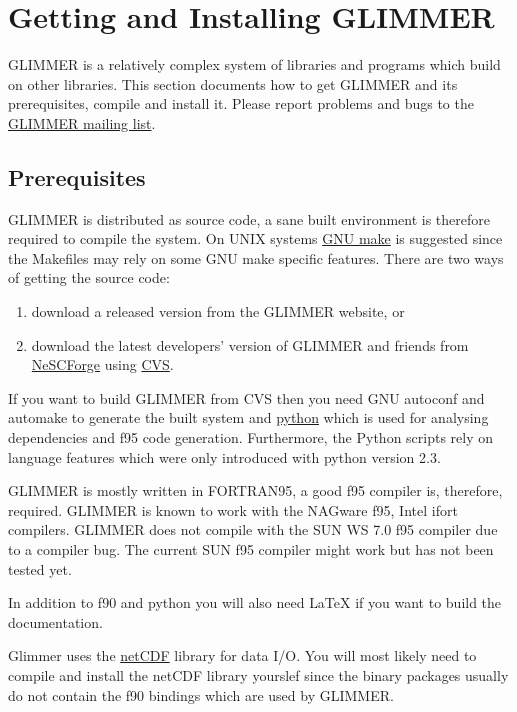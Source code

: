 \section{Getting and Installing GLIMMER}
GLIMMER is a relatively complex system of libraries and programs which build on other libraries. This section documents how to get GLIMMER and its prerequisites, compile and install it. Please report problems and bugs to the \href{http://forge.nesc.ac.uk/mailman/listinfo/glimmer-discuss}{GLIMMER mailing list}.

\subsection{Prerequisites}
GLIMMER is distributed as source code, a sane built environment is therefore required to compile the system. On UNIX systems \href{http://www.gnu.org/software/make/}{GNU make} is suggested since the Makefiles may rely on some GNU make specific features. There are two ways of getting the source code:
\begin{enumerate}
\item download a released version from the GLIMMER website, or
\item download the latest developers' version of GLIMMER and friends from \href{http://forge.nesc.ac.uk/}{NeSCForge} using \href{http://www.gnu.org/software/cvs/}{CVS}.
\end{enumerate}
If you want to build GLIMMER from CVS then you need GNU autoconf and automake to generate the built system and \href{http://www.python.org}{python} which is used for analysing dependencies and f95 code generation. Furthermore, the Python scripts rely on language features which were only introduced with python version 2.3.

GLIMMER is mostly written in FORTRAN95, a good f95 compiler is, therefore, required. GLIMMER is known to work with the NAGware f95, Intel ifort compilers. GLIMMER does not compile with the SUN WS 7.0 f95 compiler due to a compiler bug. The current SUN f95 compiler might work but has not been tested yet.

In addition to f90 and python you will also need {\LaTeX} if you want to build the documentation.

Glimmer uses the \href{http://www.unidata.ucar.edu/packages/netcdf/index.html}{netCDF} library for data I/O. You will most likely need to compile and install the netCDF library yourslef since the binary packages usually do not contain the f90 bindings which are used by GLIMMER.


